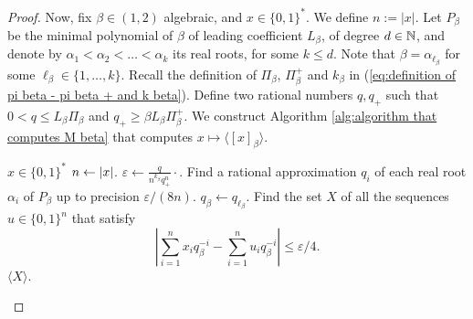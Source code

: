 \begin{proof}
    Now, fix $\beta \in (1,2)$ algebraic, and $x \in \{0,1\}^\ast$. We define $n := |x|$. Let $P_\beta$ be the minimal polynomial of $\beta$ of leading coefficient $L_\beta$, of degree $d \in \mathbb{N}$, and denote by $\alpha_1 < \alpha_2 < \ldots < \alpha_k$ its real roots, for some $k \leq d$. Note that $\beta = \alpha_{\ell_\beta}$ for some $\ell_\beta \in \{1,\ldots, k\}$. Recall the definition of $\Pi_\beta$, $\Pi_\beta^+$ and $k_\beta$ in (\ref{eq:definition of pi beta - pi beta + and k beta}). Define two rational numbers $q,q_+$ such that $0 < q \leq L_\beta \Pi_\beta$ and $q_+ \geq \beta L_\beta \Pi_\beta^+$. We construct Algorithm \ref{alg:algorithm that computes M beta} that computes $x \mapsto \langle [x]_\beta \rangle$.
    \begin{algorithm}[ht]
        \caption{Algorithm for computing $x \mapsto \langle [x]_\beta \rangle$}
        \label{alg:algorithm that computes M beta}
        \begin{algorithmic}[1]
            \Require $x \in \{0,1\}^\ast$
            \State $n \gets \left| x \right|$.
            \State $\varepsilon \gets \frac{q}{n^{k_\beta} q_+^n}\cdot$. \label{line:definition epsilon:alg:algorithm that computes M beta}
            \State Find a rational approximation $q_i$ of each real root $\alpha_i$ of $P_\beta$ up to precision $\varepsilon/(8n)$.\label{line:approximation roots of P beta:alg:algorithm that computes M beta}
            \State $q_\beta \gets q_{\ell_\beta}$.\label{line:definition of q beta:alg:algorithm that computes M beta}
            \State Find the set $X$ of all the sequences $u \in \{0,1\}^n$ that satisfy \label{line:definition of X:alg:algorithm that computes M beta}
            \begin{equation}\label{eq:definition of X:alg:algorithm that computes M beta}
                \left| \sum_{i=1}^n x_i q_\beta^{-i} - \sum_{i=1}^n u_i q_\beta^{-i} \right| \leq \varepsilon/4.
            \end{equation}
            \State \Return $\langle X \rangle$.
        \end{algorithmic}
        \end{algorithm}


\end{proof}
